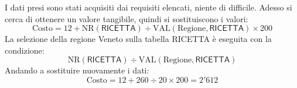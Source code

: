 \documentclass[a4paper]{article}
\begin{document}
	\noindent
	I dati presi sono stati acquisiti dai requisiti elencati, niente di difficile. Adesso si cerca di ottenere un valore tangibile, quindi si sostituiscono i valori:
	\begin{equation*}
		\text{Costo} = 12 + \mathrm{NR}\left(\textsf{RICETTA}\right) \div \mathrm{VAL}\left(\text{Regione}, \textsf{RICETTA}\right) \times 200
	\end{equation*}
	La selezione della regione Veneto sulla tabella \textsf{RICETTA} è eseguita con la condizione:
	\begin{equation*}
		\mathrm{NR}\left(\textsf{RICETTA}\right) \div \mathrm{VAL}\left(\text{Regione}, \textsf{RICETTA}\right)
	\end{equation*}
	Andando a sostituire nuovamente i dati:
	\begin{equation*}
		\text{Costo} = 12 + 260 \div 20 \times 200 = 2'612
	\end{equation*}\newpage
	
\end{document}
